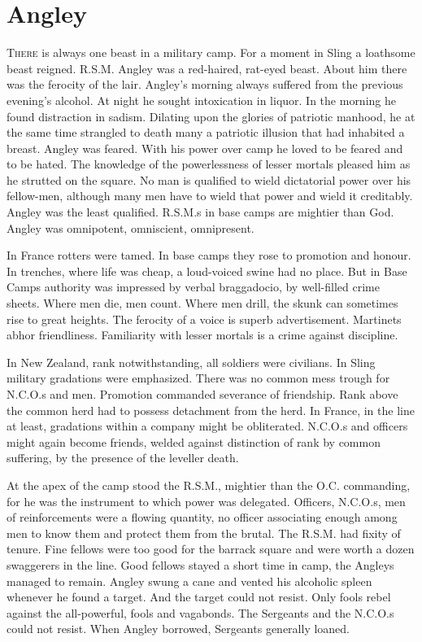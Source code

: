 \chapter*{\textsf{Angley}}

T\textsc{here} is always one beast in a military camp. For a moment in Sling a 
loathsome beast reigned. R.S.M. Angley was a red-haired, rat-eyed beast.
About him there was the ferocity of the lair. Angley's morning always suffered 
from the previous evening's alcohol. At night he sought intoxication in liquor. 
In the morning he found distraction in sadism. Dilating upon the glories of 
patriotic manhood, he at the same time strangled to death many a patriotic 
illusion that had inhabited a breast. Angley was feared. With his power over 
camp he loved to be feared and to be hated. The knowledge of the powerlessness 
of lesser mortals pleased him as he strutted on the square. No man is qualified 
to wield dictatorial power over his fellow-men, although many men have to wield 
that power and wield it creditably. Angley was the least qualified. R.S.M.s in base 
camps are mightier than God. Angley was omnipotent, omniscient, omnipresent.

In France rotters were tamed. In base camps they rose to promotion and honour. In 
trenches, where life was cheap, a loud-voiced swine had no place. But in Base Camps 
authority was impressed by verbal braggadocio, by well-filled crime sheets. Where 
men die, men count. Where men drill, the skunk can sometimes rise to great heights. 
The ferocity of a voice is superb advertisement. Martinets abhor friendliness. 
Familiarity with lesser mortals is a crime against discipline.

In New Zealand, rank notwithstanding, all soldiers were civilians. In Sling military 
gradations were emphasized. There was no common mess trough for N.C.O.s and men. 
Promotion commanded severance of friendship. Rank above the common herd had to 
possess detachment from the herd. In France, in the line at least, gradations 
within a company might be obliterated. N.C.O.s and officers might again become 
friends, welded against distinction of rank by common suffering, by the presence 
of the leveller death.

At the apex of the camp stood the R.S.M., mightier than the O.C. commanding, for 
he was the instrument to which power was delegated. Officers, N.C.O.s, men of 
reinforcements were a flowing quantity, no officer associating enough among men 
to know them and protect them from the brutal. The R.S.M. had fixity of tenure. 
Fine fellows were too good for the barrack square and were worth a dozen swaggerers 
in the line. Good fellows stayed a short time in camp, the Angleys managed to remain. 
Angley swung a cane and vented his alcoholic spleen whenever he found a target. And 
the target could not resist. Only fools rebel against the all-powerful, fools and 
vagabonds. The Sergeants and the N.C.O.s could not resist. When Angley borrowed, 
Sergeants generally loaned.

